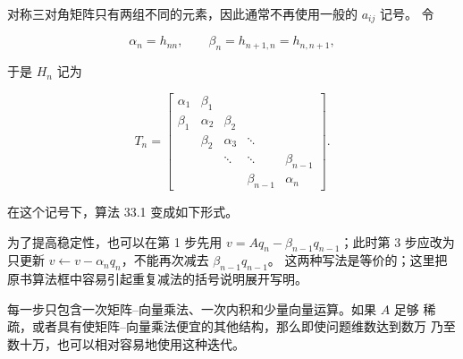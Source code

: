 \documentclass[UTF8,fontset=none,12pt]{ctexart}
\begin{document}
对称三对角矩阵只有两组不同的元素，因此通常不再使用一般的 $a_{ij}$ 记号。
令

\[
\alpha_n=h_{nn},\qquad
\beta_n=h_{n+1,n}=h_{n,n+1},
\]

于是 $H_n$ 记为

\begin{equation}
T_n=
\begin{bmatrix}
\alpha_1&\beta_1\\
\beta_1&\alpha_2&\beta_2\\
&\beta_2&\alpha_3&\ddots\\
&&\ddots&\ddots&\beta_{n-1}\\
&&&\beta_{n-1}&\alpha_n
\end{bmatrix}.
\tag{36.3}
\end{equation}

在这个记号下，算法 33.1 变成如下形式。

\begin{center}
\end{center}

为了提高稳定性，也可以在第 1 步先用
$v=Aq_n-\beta_{n-1}q_{n-1}$；此时第 3 步应改为只更新
$v\leftarrow v-\alpha_nq_n$，不能再次减去 $\beta_{n-1}q_{n-1}$。
这两种写法是等价的；这里把原书算法框中容易引起重复减法的括号说明展开写明。

每一步只包含一次矩阵--向量乘法、一次内积和少量向量运算。如果 $A$ 足够
稀疏，或者具有使矩阵--向量乘法便宜的其他结构，那么即使问题维数达到数万
乃至数十万，也可以相对容易地使用这种迭代。
\end{document}

